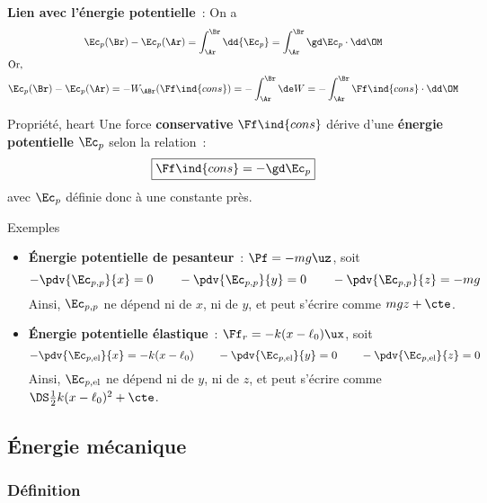\documentclass[../main/main.tex]{subfiles}
\begin{document}
\textbf{Lien avec l'énergie potentielle}~: On a
\begin{gather*}
    \Ec_p(\Br) - \Ec_p(\Ar) = \int_{\Ar}^{\Br} \dd{\Ec_p} = \int_{\Ar}^{\Br}
    \gd\Ec_p\cdot\dd\OM
    \\
    \shortintertext{Or,}
    \Ec_p(\Br) - \Ec_p(\Ar) = -W_{\ABr}(\Ff\ind{cons}) = - \int_{\Ar}^{\Br} \de W = -
    \int_{\Ar}^{\Br} \Ff\ind{cons}\cdot\dd\OM
\end{gather*}

\begin{tprop}{Propriété, heart}
    Une force \textbf{conservative} $\Ff\ind{cons}$ dérive d'une \textbf{énergie
    potentielle} $\Ec_p$ selon la relation~:
    \[\boxed{\Ff\ind{cons} = -\gd\Ec_p}\]
    avec $\Ec_p$ définie donc à une constante près.
\end{tprop}

\begin{rexem}{Exemples}
    \begin{itemize}
        \item \textbf{Énergie potentielle de pesanteur}~: $\Pf = -mg\uz$, soit
            \[
                -\pdv{\Ec_{p,p}}{x} = 0
                \qquad
                -\pdv{\Ec_{p,p}}{y} = 0
                \qquad
                -\pdv{\Ec_{p,p}}{z} = -mg
            \]
            Ainsi, $\Ec_{p,p}$ ne dépend ni de $x$, ni de $y$, et peut s'écrire
            comme $mgz + \cte$.
        \item \textbf{Énergie potentielle élastique}~: $\Ff_r =
            -k(x-\ell_0)\ux$, soit
            \[
                -\pdv{\Ec_{p,\rm el}}{x} = -k(x-\ell_0)
                \qquad
                -\pdv{\Ec_{p,\rm el}}{y} = 0
                \qquad
                -\pdv{\Ec_{p,\rm el}}{z} = 0
            \]
            Ainsi, $\Ec_{p,\rm el}$ ne dépend ni de $y$, ni de $z$, et peut s'écrire
            comme $\DS \frac{1}{2}k(x-\ell_0)^2 + \cte$.
    \end{itemize}
\end{rexem}

\subsection{Énergie mécanique}
\subsubsection{Définition}
\end{document}

